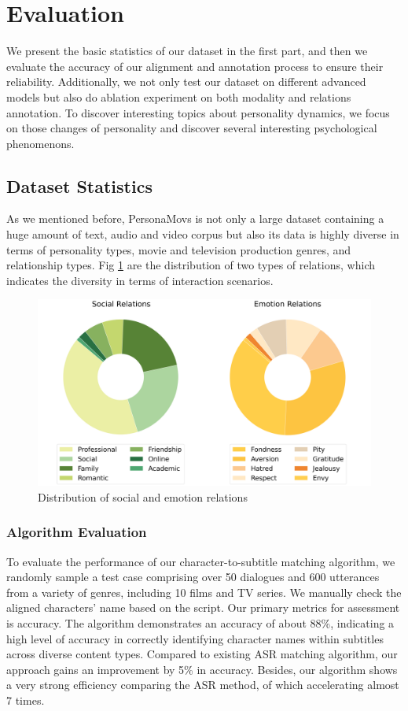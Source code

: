 \section{Evaluation}
 We present the basic statistics of our dataset in the first part, and then we evaluate the accuracy of our alignment and annotation process to ensure their reliability. Additionally, we not only test our dataset on different advanced models but also do ablation experiment on both modality and relations annotation. To discover interesting topics about personality dynamics, we focus on those changes of personality and discover several interesting psychological phenomenons.

\subsection{Dataset Statistics}

As we mentioned before, PersonaMovs is not only a large dataset containing a huge amount of text, audio and video corpus but also its data is highly diverse in terms of personality types, movie and television production genres, and relationship types. Fig \ref{Fig:Relats} are the distribution of two types of relations, which indicates the diversity in terms of interaction scenarios.

\begin{figure}[ht]
    \centering
    \includegraphics[width=0.75\linewidth]{images/relations.png}
    \caption{Distribution of social and emotion relations}
    \label{Fig:Relats}
\end{figure}


\subsubsection{Algorithm Evaluation}

To evaluate the performance of our character-to-subtitle matching algorithm, we randomly sample a test case comprising over 50 dialogues and 600 utterances from a variety of genres, including 10 films and TV series. We manually check the aligned characters' name based on the script. Our primary metrics for assessment is accuracy. The algorithm demonstrates an accuracy of about 88\%, indicating a high level of accuracy in correctly identifying character names within subtitles across diverse content types. Compared to existing ASR matching algorithm, our approach gains an improvement by 5\% in accuracy. Besides, our algorithm shows a very strong efficiency comparing the ASR method, of which accelerating almost 7 times.

